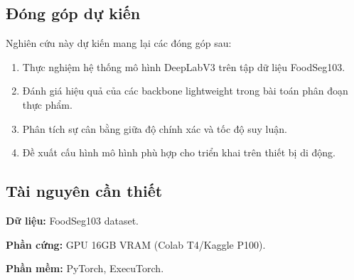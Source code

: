 \subsection{Đóng góp dự kiến}

Nghiên cứu này dự kiến mang lại các đóng góp sau:
\begin{enumerate}
    \item Thực nghiệm hệ thống mô hình DeepLabV3 trên tập dữ liệu FoodSeg103.
    \item Đánh giá hiệu quả của các backbone lightweight trong bài toán phân đoạn thực phẩm.
    \item Phân tích sự cân bằng giữa độ chính xác và tốc độ suy luận.
    \item Đề xuất cấu hình mô hình phù hợp cho triển khai trên thiết bị di động.
\end{enumerate}

\subsection{Tài nguyên cần thiết}

\textbf{Dữ liệu:} FoodSeg103 dataset.

\textbf{Phần cứng:} GPU 16GB VRAM (Colab T4/Kaggle P100).

\textbf{Phần mềm:} PyTorch, ExecuTorch.
